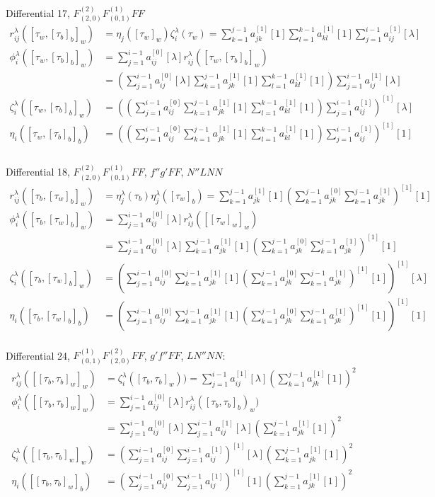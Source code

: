 \documentclass[english,unicode]{article}
\def\SiL{\sum_{j=1}^{i-1}a_{ij}^{[0]}[\lambda]}
\def\SiIL{\sum_{j=1}^{i-1}a_{ij}^{[1]}[\lambda]}
\def\Si{\sum_{j=1}^{i-1}a_{ij}^{[0]}}
\def\SiI{\sum_{j=1}^{i-1}a_{ij}^{[1]}}
\def\SjIO{\sum_{k=1}^{j-1}a_{jk}^{[1]}[1]}
\def\SkIO{\sum_{l=1}^{k-1}a_{kl}^{[1]}[1]}
\begin{document}
Differential  17, $F^{(2)}_{(2,0)}F^{(1)}_{(0,1)}FF$
\begin{align*}
r_{ij}^\lambda([\tau_w,[\tau_b]_b]_w)& =\eta_j([\tau_w]_w)\zeta_i^\lambda(\tau_w)=\SjIO \SkIO\SiIL\\
\phi_i^\lambda([\tau_w,[\tau_b]_b]_w) &= \sum_{j=1}^{i-1}a_{ij}^{[0]}[\lambda]r_{ij}^\lambda ([\tau_w,[\tau_b]_b]_w)\\
&= (\SiL\SjIO \SkIO)\SiIL\\
\zeta_i^\lambda([\tau_w,[\tau_b]_b]_w) & =((\Si\SjIO \SkIO)\SiI)^{[1]}[\lambda]\\
\eta_i([\tau_w,[\tau_b]_b]_b) & = ((\Si\SjIO \SkIO)\SiI)^{[1]}[1]\\\\
\end{align*}

Differential 18, $F^{(2)}_{(2,0)}F^{(1)}_{(0,1)}FF$, $f''g'FF $, $N''LNN$ 
\begin{align*}
r_{ij}^\lambda([\tau_b,[\tau_w]_b]_w)& =\eta_j^\lambda(\tau_b)\eta_j^\lambda([\tau_w]_b)=\sum_{k=1}^{j-1}a_{jk}^{[1]}[1](\sum_{k=1}^{j-1}a_{jk}^{[0]}\sum_{k=1}^{j-1}a_{jk}^{[1]})^{[1]}[1]\\
\phi_i^\lambda([\tau_b,[\tau_w]_b]_w) &= \sum_{j=1}^{i-1}a_{ij}^{[0]}[\lambda]r_{ij}^\lambda ([[\tau_w]_w]_w)\\
&= \sum_{j=1}^{i-1}a_{ij}^{[0]}[\lambda]\sum_{k=1}^{j-1}a_{jk}^{[1]}[1](\sum_{k=1}^{j-1}a_{jk}^{[0]}\sum_{k=1}^{j-1}a_{jk}^{[1]})^{[1]}[1]\\
\zeta_i^\lambda([\tau_b,[\tau_w]_b]_w) & = (\sum_{j=1}^{i-1}a_{ij}^{[0]}\sum_{k=1}^{j-1}a_{jk}^{[1]}[1](\sum_{k=1}^{j-1}a_{jk}^{[0]}\sum_{k=1}^{j-1}a_{jk}^{[1]})^{[1]}[1])^{[1]}[\lambda]\\
\eta_i([\tau_b,[\tau_w]_b]_b) & = (\sum_{j=1}^{i-1}a_{ij}^{[0]}\sum_{k=1}^{j-1}a_{jk}^{[1]}[1](\sum_{k=1}^{j-1}a_{jk}^{[0]}\sum_{k=1}^{j-1}a_{jk}^{[1]})^{[1]}[1])^{[1]}[1]\\
\end{align*}

Differential 24, $F^{(1)}_{(0,1)}F^{(2)}_{(2,0)}FF$, $g'f''FF$,  $LN''NN$:
\begin{align*}
r_{ij}^\lambda([[\tau_b,\tau_b]_w]_w)& =\zeta_i^{\lambda}([\tau_b,\tau_b]_w)) =\sum_{j=1}^{i-1}a_{ij}^{[1]}[\lambda](\sum_{k=1}^{j-1} a_{jk}^{[1]}[1])^2\\
\phi_i^\lambda([[\tau_b,\tau_b]_w]_w) &= \sum_{j=1}^{i-1}a_{ij}^{[0]}[\lambda]r_{ij}^\lambda ([\tau_b,\tau_b]_b)_w)\\
& = \sum_{j=1}^{i-1}a_{ij}^{[0]}[\lambda]\sum_{j=1}^{i-1}a_{ij}^{[1]}[\lambda](\sum_{k=1}^{j-1} a_{jk}^{[1]}[1])^2\\
\zeta_i^\lambda([[\tau_b,\tau_b]_w]_w) & =(\sum_{j=1}^{i-1}a_{ij}^{[0]}\sum_{j=1}^{i-1}a_{ij}^{[1]})^{[1]}[\lambda](\sum_{k=1}^{j-1} a_{jk}^{[1]}[1])^2\\
\eta_i([[\tau_b,\tau_b]_w]_b) & =(\sum_{j=1}^{i-1}a_{ij}^{[0]}\sum_{j=1}^{i-1}a_{ij}^{[1]})^{[1]}[1](\sum_{k=1}^{j-1} a_{jk}^{[1]}[1])^2\\
\end{align*}
\end{document}
